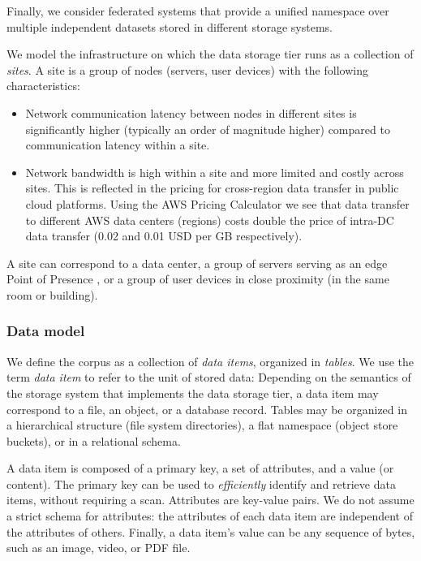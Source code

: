Finally, we consider federated systems that provide a unified namespace over multiple independent datasets stored in different storage systems.

We model the infrastructure on which the data storage tier runs as a collection of \textit{sites}.
A site is a group of nodes (servers, user devices) with the following characteristics:
\begin{itemize}
  \item Network communication latency between nodes in different sites is significantly higher (typically an order of
  magnitude higher) \cite{pbailis:hats} compared to communication latency within a site.
  \item Network bandwidth is high within a site and more limited and costly across sites.
  This is reflected in the pricing for cross-region data transfer in public cloud platforms.
  Using the AWS Pricing Calculator \cite{aws:costcalc} we see that data transfer to different AWS data centers
  (regions) costs double the price of intra-DC data transfer (0.02 and 0.01 USD per GB respectively).
\end{itemize}

A site can correspond to a data center, a group of servers serving as an edge Point of Presence \cite{google:infra}, or
a group of user devices in close proximity (in the same room or building).

\subsubsection{Data model}
We define the corpus as a collection of \textit{data items}, organized in \textit{tables}.
We use the term \textit{data item} to refer to the unit of stored data:
Depending on the semantics of the storage system that implements the data storage tier,
a data item may correspond to a file, an object, or a database record.
Tables may be organized in a hierarchical structure (file system directories), a flat namespace (object store buckets),
or in a relational schema.

A data item is composed of a primary key, a set of attributes, and a value (or content).
The primary key can be used to \textit{efficiently} identify and retrieve data items, without requiring a scan.
Attributes are key-value pairs.
We do not assume a strict schema for attributes: the attributes of each data item are independent of the attributes of
others.
Finally, a data item's value can be any sequence of bytes, such as an image, video, or PDF file.

